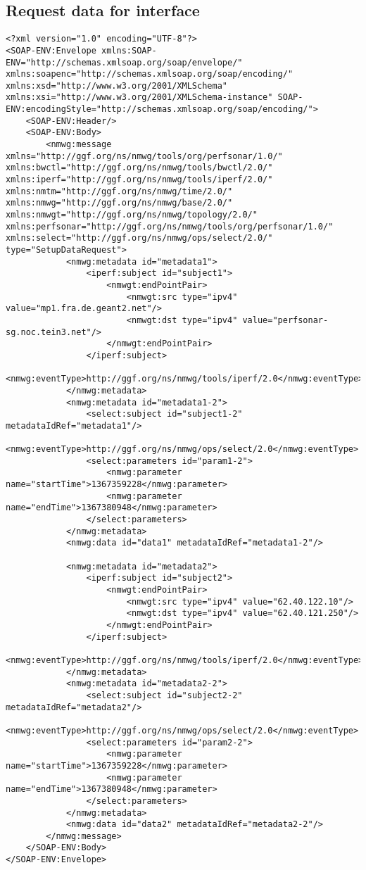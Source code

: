 \documentclass[a4paper,12pt,titlepage,hidelinks,fleqn]{article}
\begin{document}
\subsection{Request data for interface}
\begin{flushleft}
\begin{framed}
\begin{lstlisting}
<?xml version="1.0" encoding="UTF-8"?>
<SOAP-ENV:Envelope xmlns:SOAP-ENV="http://schemas.xmlsoap.org/soap/envelope/" xmlns:soapenc="http://schemas.xmlsoap.org/soap/encoding/" xmlns:xsd="http://www.w3.org/2001/XMLSchema" xmlns:xsi="http://www.w3.org/2001/XMLSchema-instance" SOAP-ENV:encodingStyle="http://schemas.xmlsoap.org/soap/encoding/">
	<SOAP-ENV:Header/>
	<SOAP-ENV:Body>
		<nmwg:message xmlns="http://ggf.org/ns/nmwg/tools/org/perfsonar/1.0/" xmlns:bwctl="http://ggf.org/ns/nmwg/tools/bwctl/2.0/" xmlns:iperf="http://ggf.org/ns/nmwg/tools/iperf/2.0/" xmlns:nmtm="http://ggf.org/ns/nmwg/time/2.0/" xmlns:nmwg="http://ggf.org/ns/nmwg/base/2.0/" xmlns:nmwgt="http://ggf.org/ns/nmwg/topology/2.0/" xmlns:perfsonar="http://ggf.org/ns/nmwg/tools/org/perfsonar/1.0/" xmlns:select="http://ggf.org/ns/nmwg/ops/select/2.0/" type="SetupDataRequest">
			<nmwg:metadata id="metadata1">
				<iperf:subject id="subject1">
					<nmwgt:endPointPair>
						<nmwgt:src type="ipv4" value="mp1.fra.de.geant2.net"/>
						<nmwgt:dst type="ipv4" value="perfsonar-sg.noc.tein3.net"/>
					</nmwgt:endPointPair>
				</iperf:subject>
				<nmwg:eventType>http://ggf.org/ns/nmwg/tools/iperf/2.0</nmwg:eventType>
			</nmwg:metadata>
			<nmwg:metadata id="metadata1-2">
				<select:subject id="subject1-2" metadataIdRef="metadata1"/>
				<nmwg:eventType>http://ggf.org/ns/nmwg/ops/select/2.0</nmwg:eventType>
				<select:parameters id="param1-2">
					<nmwg:parameter name="startTime">1367359228</nmwg:parameter>
					<nmwg:parameter name="endTime">1367380948</nmwg:parameter>
				</select:parameters>
			</nmwg:metadata>
			<nmwg:data id="data1" metadataIdRef="metadata1-2"/>
			
			<nmwg:metadata id="metadata2">
				<iperf:subject id="subject2">
					<nmwgt:endPointPair>
						<nmwgt:src type="ipv4" value="62.40.122.10"/>
						<nmwgt:dst type="ipv4" value="62.40.121.250"/>
					</nmwgt:endPointPair>
				</iperf:subject>
				<nmwg:eventType>http://ggf.org/ns/nmwg/tools/iperf/2.0</nmwg:eventType>
			</nmwg:metadata>
			<nmwg:metadata id="metadata2-2">
				<select:subject id="subject2-2" metadataIdRef="metadata2"/>
				<nmwg:eventType>http://ggf.org/ns/nmwg/ops/select/2.0</nmwg:eventType>
				<select:parameters id="param2-2">
					<nmwg:parameter name="startTime">1367359228</nmwg:parameter>
					<nmwg:parameter name="endTime">1367380948</nmwg:parameter>
				</select:parameters>
			</nmwg:metadata>
			<nmwg:data id="data2" metadataIdRef="metadata2-2"/>
		</nmwg:message>
	</SOAP-ENV:Body>
</SOAP-ENV:Envelope>
\end{lstlisting}
\end{framed}
\end{flushleft}
\end{document}
